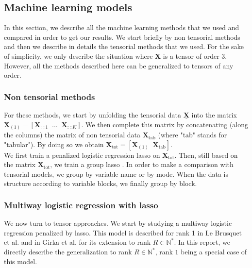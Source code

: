 \documentclass[preprint,12pt]{elsarticle}
\begin{document}
\subsection{Machine learning models}
\label{sec:models}

In this section, we describe all the machine learning methods that we used and compared in order to get our results. We start briefly by non tensorial methods and then we describe in details the tensorial methods that we used. For the sake of simplicity, we only describe the situation where $\underline{\mathbf{X}}$ is a tensor of order 3. However, all the methods described here can be generalized to tensors of any order.
\subsubsection{Non tensorial methods}
For these methods, we start by unfolding the tensorial data $\underline{\mathbf{X}}$ into the matrix $\mathbf{X}_{(1)} = [\mathbf{X}_{:\,:1}\; \; \ldots \; \;\mathbf{X}_{:\,:K}]$. We then complete this matrix  by concatenating (along the columns) the matrix of non tensorial data $\mathbf{X}_{\text{tab}}$ (where "tab" stands for "tabular"). By doing so we obtain $\mathbf{X}_{\text{tot}} = [\mathbf{X}_{(1)} \; \; \mathbf{X}_{\text{tab}}]$.\\
\indent We first train a penalized logistic regression lasso on $\mathbf{X}_{\text{tot}}$. Then, still based on the matrix $\mathbf{X}_{\text{tot}}$, we train a group lasso \cite{grp_lasso}. In order to make a comparison with tensorial models, we group by variable name or by mode. When the data is structure according to variable blocks, we finally group by block. 
\subsubsection{Multiway logistic regression with lasso}
\indent We now turn to tensor approaches. We start by studying a multiway logistic regression penalized by lasso. This model is described for rank 1 in Le Brusquet et al. \cite{multi_rank_1} and in Girka et al. \cite{multi_rank_r} for its extension to rank $R \in \mathbb{N}^{*}$. In this report, we directly describe the generalization to rank $R \in \mathbb{N}^{*}$, rank $1$ being a special case of this model.\\[5 pt]
\end{document}
